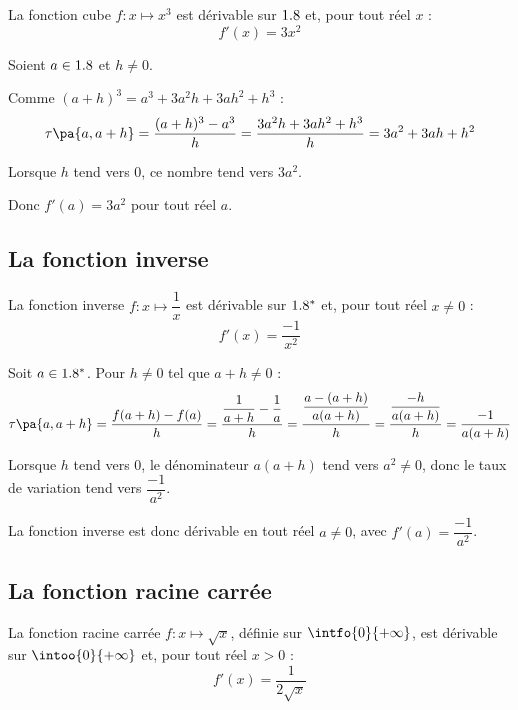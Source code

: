 \begin{propriete}
	La fonction cube $f : x \longmapsto x^3$ est dérivable sur $1.8$ et, pour tout réel $x$ :
	\[
		f'(x) = 3x^2
	\]

\end{propriete}

\begin{demonstration}
	Soient $a \in 1.8$ et $h \neq 0$.

	Comme $(a + h)^3 = a^3 + 3a^2 h + 3a h^2 + h^3$ :
	\[
		\tau\pa{a,a+h} = \dfrac{(a + h)^3 - a^3}{h} = \dfrac{3a^2 h + 3a h^2 + h^3}{h} = 3a^2 + 3ah + h^2
	\]

	Lorsque $h$ tend vers $0$, ce nombre tend vers $3a^2$.

	Donc $f'(a) = 3a^2$ pour tout réel $a$.
\end{demonstration}

\subsection{La fonction inverse}

\begin{propriete}
	La fonction inverse $f : x \longmapsto \dfrac{1}{x}$ est dérivable sur $1.8^*$ et, pour tout réel $x \neq 0$ :
	\[
		f'(x) = \dfrac{-1}{x^2}
	\]

\end{propriete}

\begin{demonstration}
	Soit $a \in 1.8^*$. Pour $h \neq 0$ tel que $a + h \neq 0$ :
	\[
		\tau\pa{a,a+h} = \dfrac{f(a + h) - f(a)}{h} = \dfrac{\dfrac{1}{a + h} - \dfrac{1}{a}}{h} = \dfrac{\dfrac{a - (a + h)}{a(a + h)}}{h} = \dfrac{\dfrac{-h}{a(a + h)}}{h} = \dfrac{-1}{a(a + h)}
	\]

	Lorsque $h$ tend vers $0$, le dénominateur $a(a + h)$ tend vers $a^2 \neq 0$, donc le taux de variation tend vers $\dfrac{-1}{a^2}$.

	La fonction inverse est donc dérivable en tout réel $a \neq 0$, avec $f'(a) = \dfrac{-1}{a^2}$.
\end{demonstration}

\subsection{La fonction racine carrée}

\begin{propriete}
	La fonction racine carrée $f : x \longmapsto \sqrt{x}$, définie sur $\intfo{0}{+\infty}$, est dérivable sur $\intoo{0}{+\infty}$ et, pour tout réel $x > 0$ :
	\[
		f'(x) = \dfrac{1}{2\sqrt{x}}
	\]

\end{propriete}

